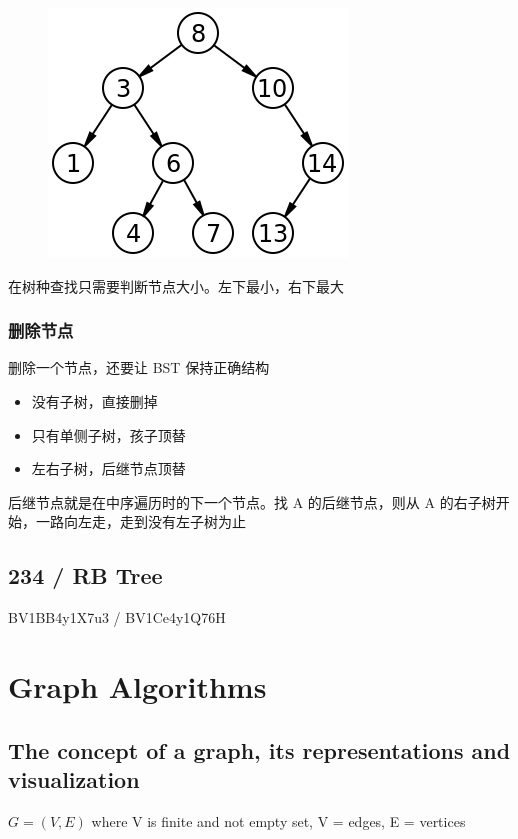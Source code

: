 \documentclass[11pt,journal,compsoc]{IEEEtran}
\begin{document}
\begin{figure}[H]
    \centering
    \includegraphics[width=0.5 \linewidth]{BST.png}
\end{figure}

在树种查找只需要判断节点大小。左下最小，右下最大


\subsubsection{删除节点}

删除一个节点，还要让 BST 保持正确结构

\begin{itemize}
    \item 没有子树，直接删掉

    \item 只有单侧子树，孩子顶替

    \item 左右子树，后继节点顶替
\end{itemize}

后继节点就是在中序遍历时的下一个节点。找 A 的后继节点，则从 A 的右子树开始，一路向左走，走到没有左子树为止


\subsection{234 / RB Tree}

BV1BB4y1X7u3 / BV1Ce4y1Q76H


\section{Graph Algorithms}


\subsection{The concept of a graph, its representations and visualization}

$G=(V,E)$ where V is finite and not empty set, V = edges, E = vertices
\end{document}
